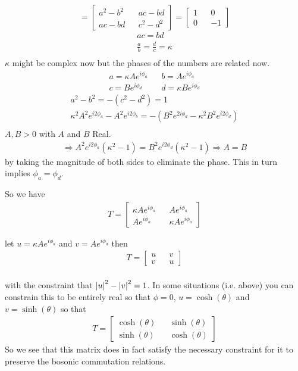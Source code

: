 \documentclass[12pt]{article}
\begin{document}
\begin{equation}
=\begin{bmatrix}
a^2 - b^2 && ac-bd\\
ac -bd && c^2-d^2
\end{bmatrix}=
\begin{bmatrix}
1 && 0\\
0 && -1
\end{bmatrix}
\end{equation}
\begin{align}
\label{eqconj3}
ac = bd\\
\frac{a}{b} = \frac{d}{c} = \kappa \\
\end{align}
$\kappa$ might be complex now but the phases of the numbers are related now.
\begin{align}
a = \kappa A e^{i \phi_a} && b = A e^{i \phi_a}\\
c =  B e^{i \phi_d} && d = \kappa B e^{i \phi_d}
\end{align}
\begin{align}
a^2-b^2 = -(c^2 - d^2) = 1\\
\kappa^2 A^2 e^{i2\phi_a} -A^2 e^{i2\phi_b} = -(B^2e^{2i\phi_d}-\kappa^2B^2e^{i2\phi_d})\\
\end{align}
$A,B>0$ with $A$ and $B$ Real.
\begin{align}
\Rightarrow A^2e^{i2\phi_a}(\kappa^2-1) = B^2e^{i2\phi_d}(\kappa^2-1)\Rightarrow A = B
\end{align}
by taking the magnitude of both sides to eliminate the phase. This in turn implies $\phi_a=\phi_d$.

So we have
\begin{align}
T=
\begin{bmatrix}
\kappa A e^{i\phi_a} && A e^{i \phi_a}\\
A e^{i \phi_a} && \kappa A e^{i \phi_a}
\end{bmatrix}
\end{align}

let $u=\kappa A e^{i\phi_a}$ and $v=Ae^{i\phi_a}$ then
\begin{align}
T=
\begin{bmatrix}
u && v\\
v&& u
\end{bmatrix}\\
\end{align}

with the constraint that $\abs{u}^2 - \abs{v}^2 = 1$. In some situations (i.e. above) you can constrain this to be entirely real so that $\phi=0$, $u=\cosh(\theta)$ and $v = \sinh(\theta)$ so that
\begin{align}
T=\begin{bmatrix}
\cosh(\theta) && \sinh(\theta)\\
\sinh(\theta) && \cosh(\theta)
\end{bmatrix}
\end{align}
So we see that this matrix does in fact satisfy the necessary constraint for it to preserve the bosonic commutation relations.
\end{document}
